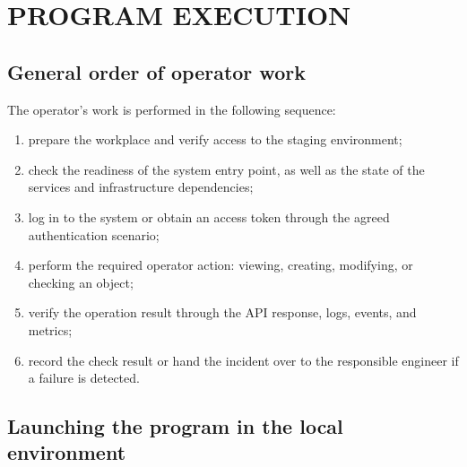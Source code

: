 \documentclass[12pt,a4paper]{extarticle}
\begin{document}
\clearpage

\section{PROGRAM EXECUTION}

\subsection{General order of operator work}

\begin{hseExample}
The operator's work is performed in the following sequence:

\begin{enumerate}[label=\arabic*), leftmargin=1.25cm]
    \item prepare the workplace and verify access to the staging environment;
    \item check the readiness of the system entry point, as well as the state of the services and infrastructure dependencies;
    \item log in to the system or obtain an access token through the agreed authentication scenario;
    \item perform the required operator action: viewing, creating, modifying, or checking an object;
    \item verify the operation result through the API response, logs, events, and metrics;
    \item record the check result or hand the incident over to the responsible engineer if a failure is detected.
\end{enumerate}
\end{hseExample}

\subsection{Launching the program in the local environment}
\end{document}
